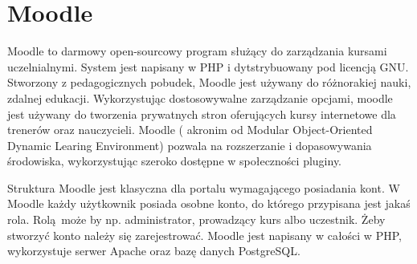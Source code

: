 \chapter{Moodle}
\label{cha:moodle}

Moodle to darmowy open-sourcowy program służący do zarządzania kursami uczelnialnymi. System jest napisany w PHP i dytstrybuowany pod licencją GNU. Stworzony z pedagogicznych pobudek, Moodle jest używany do różnorakiej nauki, zdalnej edukacji. Wykorzystując dostosowywalne zarządzanie opcjami, moodle jest używany do tworzenia prywatnych stron oferujących kursy internetowe dla trenerów oraz nauczycieli. Moodle ( akronim od Modular Object-Oriented Dynamic Learing Environment) pozwala na rozszerzanie i dopasowywania środowiska, wykorzystując szeroko dostępne w społeczności pluginy.

Struktura Moodle jest klasyczna dla portalu wymagającego posiadania kont. W Moodle każdy użytkownik posiada osobne konto, do którego przypisana jest jakaś rola. Rolą może by np. administrator, prowadzący kurs albo uczestnik. Żeby stworzyć konto należy się zarejestrować. Moodle jest napisany w całości w PHP, wykorzystuje serwer Apache oraz bazę danych PostgreSQL.

